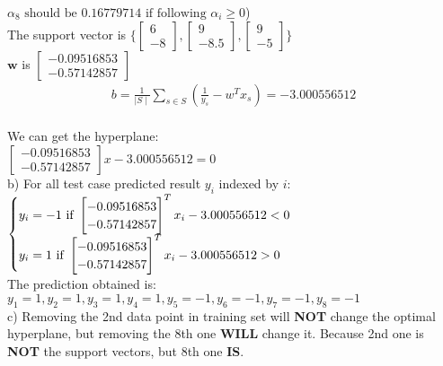 \documentclass[12pt]{article}
\begin{document}
$ \alpha_{8}\text{ should be } 0.16779714 \text{ if following } \alpha_{i} \geq 0$)\\
The support vector is $\bigg\{\begin{bmatrix}
6\\-8
\end{bmatrix},\begin{bmatrix}
9\\-8.5
\end{bmatrix},\begin{bmatrix}
9\\-5
\end{bmatrix}\bigg\}$\\
$\textbf{w}$ is $\begin{bmatrix}
-0.09516853\\-0.57142857
\end{bmatrix}$
\begin{align*}
b = \frac{1}{\mid S\mid} \sum_{s\in S}(\frac{1}{y_{s}} - w^{T}x_{s}) = -3.000556512
\end{align*}\\
We can get the hyperplane: \\$\begin{bmatrix}
-0.09516853\\-0.57142857
\end{bmatrix}x - 3.000556512 = 0$\\[0.1in]
b) For all test case predicted result $y_{i}$ indexed by $i$:\\
$\begin{cases}
y_{i} = -1 \text{ if   } 
\begin{bmatrix}-0.09516853\\-0.57142857
\end{bmatrix}^{T}x_{i}- 3.000556512 < 0\\
y_{i} = 1 \text{ if   } 
\begin{bmatrix}-0.09516853\\-0.57142857
\end{bmatrix}^{T}x_{i}- 3.000556512 > 0\end{cases}\\
$\\
The prediction obtained is:\\
$y_{1} = 1, y_{2} = 1, y_{3} = 1, y_{4} = 1, y_{5} = -1, y_{6} = -1, y_{7} = -1, y_{8} = -1$\\[0.1in]
c) Removing the 2nd data point in training set will \textbf{NOT} change the optimal hyperplane, but removing the 8th one \textbf{WILL} change it. Because 2nd one is \textbf{NOT} the support vectors, but 8th one \textbf{IS}.\\
\end{document}
